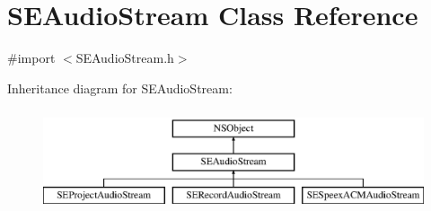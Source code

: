 \hypertarget{interface_s_e_audio_stream}{\section{S\-E\-Audio\-Stream Class Reference}
\label{interface_s_e_audio_stream}
}


{\ttfamily \#import $<$S\-E\-Audio\-Stream.\-h$>$}

Inheritance diagram for S\-E\-Audio\-Stream\-:\begin{figure}[H]
\begin{center}
\leavevmode
\includegraphics[height=3.000000cm]{interface_s_e_audio_stream}
\end{center}
\end{figure}
